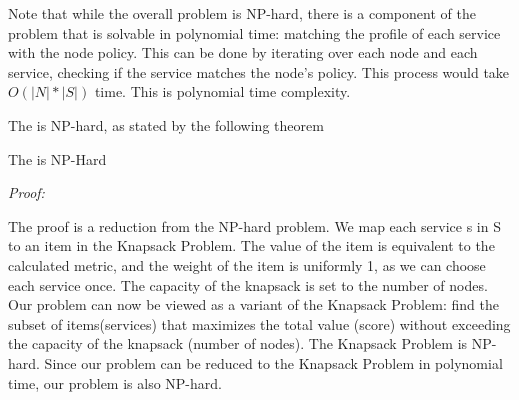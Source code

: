\begin{problem}

\end{problem}

Note that while the overall problem is NP-hard, there is a component of the problem that is solvable in polynomial time: matching the profile of each service with the node policy.
This can be done by iterating over each node and each service, checking if the service matches the node’s policy.
This process would take $O(|N|*|S|)$ time. This is polynomial time complexity.

The \problem is NP-hard, as stated by the following theorem
\begin{theorem}
  The \problem is NP-Hard
\end{theorem}
\emph{Proof: }

The proof is a reduction from the NP-hard problem. We map each service s in S to an item in the Knapsack Problem.
The value of the item is equivalent to the calculated metric, and the weight of the item is uniformly 1, as we can choose each service once. The capacity of the knapsack is set to the number of nodes.
Our problem can now be viewed as a variant of the Knapsack Problem: find the subset of items(services)
that maximizes the total value (score) without exceeding the capacity of the knapsack (number of nodes).
The Knapsack Problem is NP-hard.
Since our problem can be reduced to the Knapsack Problem in polynomial time, our problem is also NP-hard.


